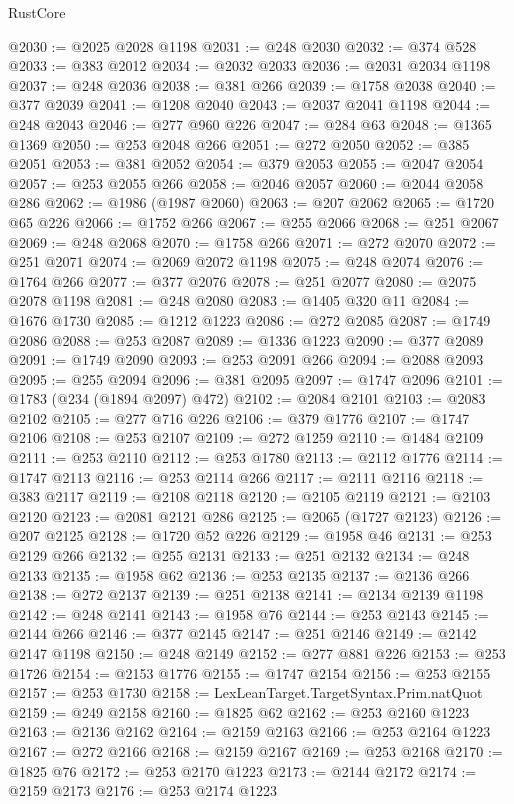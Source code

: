 \begin{lexlean}{RustCore}
\begin{coremodule}
@2030 := @2025 @2028 @1198
@2031 := @248 @2030
@2032 := @374 @528
@2033 := @383 @2012
@2034 := @2032 @2033
@2036 := @2031 @2034 @1198
@2037 := @248 @2036
@2038 := @381 @266
@2039 := @1758 @2038
@2040 := @377 @2039
@2041 := @1208 @2040
@2043 := @2037 @2041 @1198
@2044 := @248 @2043
@2046 := @277 @960 @226
@2047 := @284 @63
@2048 := @1365 @1369
@2050 := @253 @2048 @266
@2051 := @272 @2050
@2052 := @385 @2051
@2053 := @381 @2052
@2054 := @379 @2053
@2055 := @2047 @2054
@2057 := @253 @2055 @266
@2058 := @2046 @2057
@2060 := @2044 @2058 @286
@2062 := @1986 (@1987 @2060)
@2063 := @207 @2062
@2065 := @1720 @65 @226
@2066 := @1752 @266
@2067 := @255 @2066
@2068 := @251 @2067
@2069 := @248 @2068
@2070 := @1758 @266
@2071 := @272 @2070
@2072 := @251 @2071
@2074 := @2069 @2072 @1198
@2075 := @248 @2074
@2076 := @1764 @266
@2077 := @377 @2076
@2078 := @251 @2077
@2080 := @2075 @2078 @1198
@2081 := @248 @2080
@2083 := @1405 @320 @11
@2084 := @1676 @1730
@2085 := @1212 @1223
@2086 := @272 @2085
@2087 := @1749 @2086
@2088 := @253 @2087
@2089 := @1336 @1223
@2090 := @377 @2089
@2091 := @1749 @2090
@2093 := @253 @2091 @266
@2094 := @2088 @2093
@2095 := @255 @2094
@2096 := @381 @2095
@2097 := @1747 @2096
@2101 := @1783 (@234 (@1894 @2097) @472)
@2102 := @2084 @2101
@2103 := @2083 @2102
@2105 := @277 @716 @226
@2106 := @379 @1776
@2107 := @1747 @2106
@2108 := @253 @2107
@2109 := @272 @1259
@2110 := @1484 @2109
@2111 := @253 @2110
@2112 := @253 @1780
@2113 := @2112 @1776
@2114 := @1747 @2113
@2116 := @253 @2114 @266
@2117 := @2111 @2116
@2118 := @383 @2117
@2119 := @2108 @2118
@2120 := @2105 @2119
@2121 := @2103 @2120
@2123 := @2081 @2121 @286
@2125 := @2065 (@1727 @2123)
@2126 := @207 @2125
@2128 := @1720 @52 @226
@2129 := @1958 @46
@2131 := @253 @2129 @266
@2132 := @255 @2131
@2133 := @251 @2132
@2134 := @248 @2133
@2135 := @1958 @62
@2136 := @253 @2135
@2137 := @2136 @266
@2138 := @272 @2137
@2139 := @251 @2138
@2141 := @2134 @2139 @1198
@2142 := @248 @2141
@2143 := @1958 @76
@2144 := @253 @2143
@2145 := @2144 @266
@2146 := @377 @2145
@2147 := @251 @2146
@2149 := @2142 @2147 @1198
@2150 := @248 @2149
@2152 := @277 @881 @226
@2153 := @253 @1726
@2154 := @2153 @1776
@2155 := @1747 @2154
@2156 := @253 @2155
@2157 := @253 @1730
@2158 := LexLeanTarget.TargetSyntax.Prim.natQuot
@2159 := @249 @2158
@2160 := @1825 @62
@2162 := @253 @2160 @1223
@2163 := @2136 @2162
@2164 := @2159 @2163
@2166 := @253 @2164 @1223
@2167 := @272 @2166
@2168 := @2159 @2167
@2169 := @253 @2168
@2170 := @1825 @76
@2172 := @253 @2170 @1223
@2173 := @2144 @2172
@2174 := @2159 @2173
@2176 := @253 @2174 @1223

\end{coremodule}
\end{lexlean}
